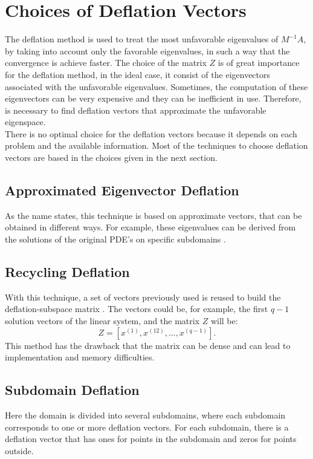\documentclass[a4paper,10pt]{report}
\begin{document}
\section{Choices of Deflation Vectors}
The deflation method is used to treat the most unfavorable eigenvalues
of $M^{-1}A$, by taking into account only the favorable eigenvalues, 
in such a way that the convergence is achieve faster. 
The choice of the matrix $Z$ is of great importance for the deflation method, in the ideal case, it
consist of the eigenvectors associated with the unfavorable eigenvalues. Sometimes, the computation of these
eigenvectors can be very expensive and they can be inefficient in use. Therefore, is necessary
to find deflation vectors that approximate the unfavorable eigenspace.\\
There is no optimal choice for the deflation vectors because it depends on each problem and the available information.
Most of the techniques to choose deflation vectors are based in the choices given in the next section.
\subsection{Approximated Eigenvector Deflation}
As the name states, this technique is based on approximate vectors, that can be obtained in different ways. For example,
these eigenvalues can be derived from the solutions of the original PDE's on specific subdomains \cite{Vuik99}.

\subsection{Recycling Deflation}
With this technique, a set of vectors previously used is reused to build the deflation-subspace matrix \cite{Clemens04}. 
The vectors could be, for example, the first $q-1$
solution vectors of the linear system, and the matrix $Z$ will be:
$$Z=[x^{(1)},x^{(12)},...,x^{(q-1)}].$$
This method has the drawback that the matrix can be dense and can lead to implementation and memory difficulties. 

\subsection{Subdomain Deflation}
Here the domain is divided into several subdomains, where each subdomain corresponds to one or more deflation vectors.
For each subdomain, there is a deflation vector that has ones for points in the subdomain and zeros for points outside\cite{Vuik02}.
\end{document}
